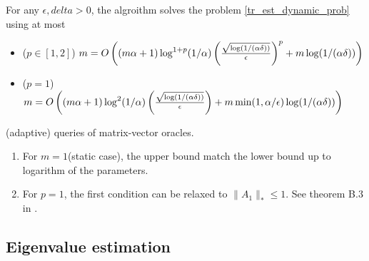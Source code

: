 \begin{thm}
\label{tr_est_alg_schatten_p}
For any $\epsilon,delta>0$, the algroithm  solves the problem \ref{tr_est_dynamic_prob} using at most
\begin{itemize}
    \item ($p\in[1,2]$) $m=O\left((m\alpha +1)\log^{1+p}(1/\alpha)\left(\frac{\sqrt{\log(1/(\alpha\delta))}}{\epsilon}\right)^p+m\log(1/(\alpha\delta))\right)$
    \item ($p=1$) $m=O\left((m\alpha +1)\log^{2}(1/\alpha)\left(\frac{\sqrt{\log(1/(\alpha\delta))}}{\epsilon}\right)+m\min(1,\alpha/\epsilon)\log(1/(\alpha\delta))\right)$
\end{itemize}
(adaptive) queries of matrix-vector oracles.
\end{thm}
\pfsk{\ref{tr_est_alg_schatten_p}}{
}
\begin{rmk}
\begin{enumerate}
    \item For $m=1$(static case), the upper bound match the lower bound up to logarithm of the parameters.
    \item For $p=1$, the first condition can be relaxed to $\|A_1\|_*\le 1$. See theorem B.3 in \cite{woodruff2022optimal}.
\end{enumerate}
\end{rmk}

\subsection{Eigenvalue estimation}
\cite{braverman2021gradient}
